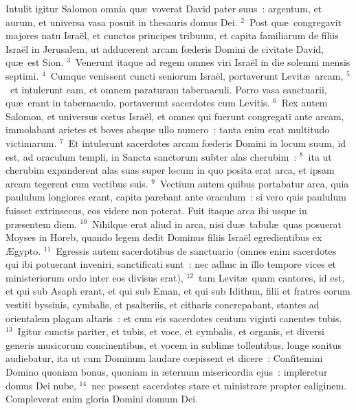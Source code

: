 \lettrine[lines=10,image=true,loversize=0.05,lraise=-0.03]{I}{}ntulit igitur Salomon omnia qu\ae\ voverat David pater suus~: argentum, et aurum, et universa vasa posuit in thesauris domus Dei.
${}^{2}$~Post qu\ae\ congregavit majores natu Isra\"el, et cunctos principes tribuum, et capita familiarum de filiis Isra\"el in Jerusalem, ut adducerent arcam fœderis Domini de civitate David, qu\ae\ est Sion.
${}^{3}$~Venerunt itaque ad regem omnes viri Isra\"el in die solemni mensis septimi.
${}^{4}$~Cumque venissent cuncti seniorum Isra\"el, portaverunt Levit\ae\ arcam,
${}^{5}$~et intulerunt eam, et omnem paraturam tabernaculi. Porro vasa sanctuarii, qu\ae\ erant in tabernaculo, portaverunt sacerdotes cum Levitis.
${}^{6}$~Rex autem Salomon, et universus cœtus Isra\"el, et omnes qui fuerunt congregati ante arcam, immolabant arietes et boves absque ullo numero~: tanta enim erat multitudo victimarum.
${}^{7}$~Et intulerunt sacerdotes arcam fœderis Domini in locum suum, id est, ad oraculum templi, in Sancta sanctorum subter alas cherubim~:
${}^{8}$~ita ut cherubim expanderent alas suas super locum in quo posita erat arca, et ipsam arcam tegerent cum vectibus suis.
${}^{9}$~Vectium autem quibus portabatur arca, quia paululum longiores erant, capita parebant ante oraculum~: si vero quis paululum fuisset extrinsecus, eos videre non poterat. Fuit itaque arca ibi usque in pr\ae sentem diem.
${}^{10}$~Nihilque erat aliud in arca, nisi du\ae\ tabul\ae\ quas posuerat Moyses in Horeb, quando legem dedit Dominus filiis Isra\"el egredientibus ex \AE gypto.
${}^{11}$~Egressis autem sacerdotibus de sanctuario (omnes enim sacerdotes qui ibi potuerant inveniri, sanctificati sunt~: nec adhuc in illo tempore vices et ministeriorum ordo inter eos divisus erat),
${}^{12}$~tam Levit\ae\ quam cantores, id est, et qui sub Asaph erant, et qui sub Eman, et qui sub Idithun, filii et fratres eorum vestiti byssinis, cymbalis, et psalteriis, et citharis concrepabant, stantes ad orientalem plagam altaris~: et cum eis sacerdotes centum viginti canentes tubis.
${}^{13}$~Igitur cunctis pariter, et tubis, et voce, et cymbalis, et organis, et diversi generis musicorum concinentibus, et vocem in sublime tollentibus, longe sonitus audiebatur, ita ut cum Dominum laudare cœpissent et dicere~: Confitemini Domino quoniam bonus, quoniam in \ae ternum misericordia ejus~: impleretur domus Dei nube,
${}^{14}$~nec possent sacerdotes stare et ministrare propter caliginem. Compleverat enim gloria Domini domum Dei.

